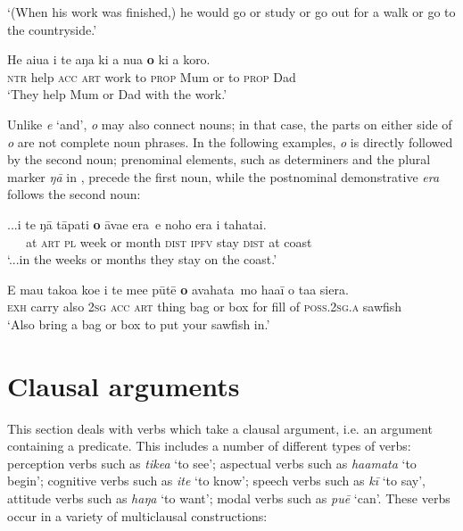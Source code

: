 \glt 
‘(When his work was finished,) he would go or study or go out for a walk or go to the countryside.’ \textstyleExampleref{[R302.051]} 
\z

\ea\label{ex:11.25}
\gll He {\ꞌ}aiua i te aŋa ki a nua \textbf{{\ꞌ}o} ki a koro. \\
\textsc{ntr} help \textsc{acc} \textsc{art} work to \textsc{prop} Mum or to \textsc{prop} Dad \\

\glt
‘They help Mum or Dad with the work.’ \textstyleExampleref{[R157.001]} 
\z

Unlike \textit{{\ꞌ}e} ‘and’, \textit{{\ꞌ}o} may also connect nouns; in that case, the parts on either side of \textit{{\ꞌ}o} are not complete noun phrases. In the following examples, \textit{{\ꞌ}o} is directly followed by the second noun; prenominal elements, such as determiners and the plural marker \textit{ŋā} in , precede the first noun, while the postnominal demonstrative \textit{era} follows the second noun:

\ea\label{ex:11.26}
\gll ...{\ꞌ}i {\ob}te ŋā tāpati \textbf{{\ꞌ}o} {\ꞌ}āva{\ꞌ}e era\,{\cb} e noho era {\ꞌ}i tahatai. \\
~~~at {\db}\textsc{art} \textsc{pl} week or month \textsc{dist} \textsc{ipfv} stay \textsc{dist} at coast \\

\glt 
‘...in the weeks or months they stay on the coast.’ \textstyleExampleref{[R200.047]} 
\z

\ea\label{ex:11.27}
\gll E ma{\ꞌ}u tako{\ꞌ}a koe i {\ob}te me{\ꞌ}e pūtē \textbf{{\ꞌ}o} {\ꞌ}avahata\,{\cb} mo ha{\ꞌ}a{\ꞌ}ī  o ta{\ꞌ}a siera.\\
\textsc{exh} carry also \textsc{2sg} \textsc{acc} {\db}\textsc{art} thing bag or box for fill  of \textsc{poss.2sg.a} sawfish\\

\glt 
‘Also bring a bag or box to put your sawfish in.’ \textstyleExampleref{[R364.031]}\textstyleExampleref{} 
\z
{}
\section{Clausal arguments}\label{sec:11.3}
This section deals with verbs which take a clausal argument, i.e. an argument containing a predicate. This includes a number of different types of verbs: perception verbs such as \textit{tike{\ꞌ}a} ‘to see’; aspectual verbs such as \textit{ha{\ꞌ}amata} ‘to begin’; cognitive verbs such as \textit{{\ꞌ}ite} ‘to know’; speech verbs such as \textit{kī} ‘to say’, attitude verbs such as \textit{haŋa} ‘to want’; modal verbs such as \textit{puē} ‘can’. These verbs occur in a variety of multiclausal constructions:

